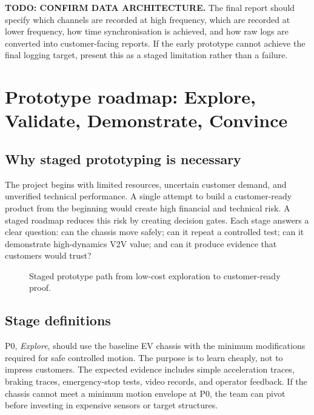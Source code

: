 \textbf{TODO: CONFIRM DATA ARCHITECTURE.} The final report should specify which channels are recorded at high frequency, which are recorded at lower frequency, how time synchronisation is achieved, and how raw logs are converted into customer-facing reports. If the early prototype cannot achieve the final logging target, present this as a staged limitation rather than a failure.

\section{Prototype roadmap: Explore, Validate, Demonstrate, Convince}

\subsection{Why staged prototyping is necessary}

The project begins with limited resources, uncertain customer demand, and unverified technical performance. A single attempt to build a customer-ready product from the beginning would create high financial and technical risk. A staged roadmap reduces this risk by creating decision gates. Each stage answers a clear question: can the chassis move safely; can it repeat a controlled test; can it demonstrate high-dynamics V2V value; and can it produce evidence that customers would trust?

\begin{figure}[H]
\centering
{}
\caption{Staged prototype path from low-cost exploration to customer-ready proof.}
\label{fig:prototype_roadmap_compact}
\end{figure}

\subsection{Stage definitions}

P0, \textit{Explore}, should use the baseline EV chassis with the minimum modifications required for safe controlled motion. The purpose is to learn cheaply, not to impress customers. The expected evidence includes simple acceleration traces, braking traces, emergency-stop tests, video records, and operator feedback. If the chassis cannot meet a minimum motion envelope at P0, the team can pivot before investing in expensive sensors or target structures.

